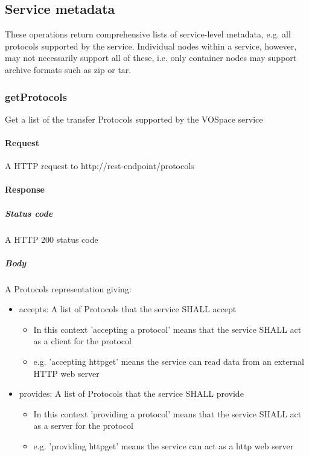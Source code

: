 \documentclass[11pt,a4paper]{ivoa}
\begin{document}
\subsection{Service metadata}
\label{subsec:service metadata}
These operations return comprehensive lists of service-level metadata, e.g. all protocols supported by the service. Individual nodes within a service, however, may not necessarily support all of these, i.e. only container nodes may support archive formats such as zip or tar.

\subsubsection{getProtocols}
\label{subsubsec:getprotocols}
Get a list of the transfer Protocols supported by the VOSpace service

\paragraph{Request}
A HTTP request to http://rest-endpoint/protocols

\paragraph{Response}
\subparagraph{Status code} A HTTP 200 status code
\subparagraph{Body}
A Protocols representation giving:
\begin{itemize}
    \item accepts: A list of Protocols that the service SHALL accept
    \begin{itemize}
        \item In this context 'accepting a protocol' means that the service SHALL act as a client for the protocol
        \item e.g. 'accepting httpget' means the service can read data from an external HTTP web server
    \end{itemize}
    \item provides: A list of Protocols that the service SHALL provide
    \begin{itemize}
        \item In this context 'providing a protocol' means that the service SHALL act as a server for the protocol
        \item e.g. 'providing httpget' means the service can act as a http web server
    \end{itemize}
\end{itemize}
\end{document}
